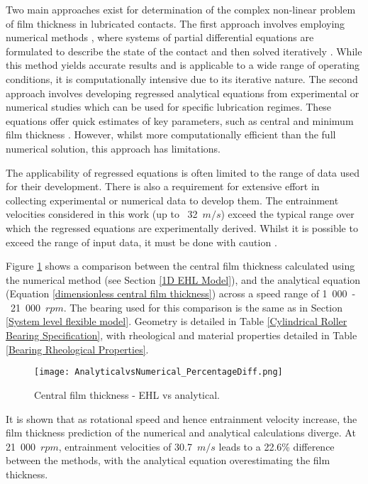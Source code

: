 Two main approaches exist for determination of the complex non-linear problem of film thickness in lubricated contacts. The first approach involves employing numerical methods \cite{Dowson1959}, where systems of partial differential equations are formulated to describe the state of the contact and then solved iteratively \cite{Gohar2018}. While this method yields accurate results and is applicable to a wide range of operating conditions, it is computationally intensive due to its iterative nature. The second approach involves developing regressed analytical equations from experimental or numerical studies which can be used for specific lubrication regimes. These equations offer quick estimates of key parameters, such as central \cite{Dowson1979} and minimum film thickness \cite{Dowson1967}. However, whilst more computationally efficient than the full numerical solution, this approach has limitations.
 
The applicability of regressed equations is often limited to the range of data used for their development. There is also a requirement for extensive effort in collecting experimental or numerical data to develop them. The entrainment velocities considered in this work (up to ~32~$m/s$) exceed the typical range over which the regressed equations are experimentally derived. Whilst it is possible to exceed the range of input data, it must be done with caution \cite{Gohar1988}.

Figure \ref{EHL_NumericalvsAnalytical_25000} shows a comparison between the central film thickness calculated using the numerical method (see Section \ref{1D EHL Model}), and the analytical equation (Equation \ref{dimensionless central film thickness}) across a speed range of 1~000~-~21~000~$rpm$. The bearing used for this comparison is the same as in Section \ref{System level flexible model}. Geometry is detailed in Table \ref{Cylindrical Roller Bearing Specification}, with rheological and material properties detailed in Table \ref{Bearing Rheological Properties}.

\begin{figure}
	\centering
	\texttt{[image: AnalyticalvsNumerical\_PercentageDiff.png]}
	\caption{Central film thickness - EHL vs analytical.}
	\label{EHL_NumericalvsAnalytical_25000}
\end{figure} 

It is shown that as rotational speed and hence entrainment velocity increase, the film thickness prediction of the numerical and analytical calculations diverge. At 21~000~$rpm$, entrainment velocities of 30.7~$m/s$ leads to a 22.6\% difference between the methods, with the analytical equation overestimating the film thickness.

